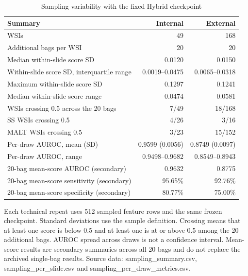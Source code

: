 \clearpage
\begin{table}[H]\centering
\caption{Sampling variability with the fixed Hybrid checkpoint}\label{tab:S10}
\small
\begin{tabular}{p{}rr}
\toprule
Summary & Internal & External \\
\midrule
WSIs & 49 & 168 \\
Additional bags per WSI & 20 & 20 \\
Median within-slide score SD & 0.0120 & 0.0150 \\
Within-slide score SD, interquartile range & 0.0019--0.0475 & 0.0065--0.0318 \\
Maximum within-slide score SD & 0.1297 & 0.1241 \\
Median within-slide score range & 0.0474 & 0.0581 \\
WSIs crossing 0.5 across the 20 bags & 7/49 & 18/168 \\
SS WSIs crossing 0.5 & 4/26 & 3/16 \\
MALT WSIs crossing 0.5 & 3/23 & 15/152 \\
Per-draw AUROC, mean (SD) & 0.9599 (0.0056) & 0.8749 (0.0097) \\
Per-draw AUROC, range & 0.9498--0.9682 & 0.8549--0.8943 \\
20-bag mean-score AUROC (secondary) & 0.9632 & 0.8775 \\
20-bag mean-score sensitivity (secondary) & 95.65\% & 92.76\% \\
20-bag mean-score specificity (secondary) & 80.77\% & 75.00\% \\
\bottomrule
\end{tabular}
\par\medskip\raggedright\footnotesize Each technical repeat uses 512 sampled feature rows and the same frozen checkpoint. Standard deviations use the sample definition. Crossing means that at least one score is below 0.5 and at least one is at or above 0.5 among the 20 additional bags. AUROC spread across draws is not a confidence interval. Mean-score results are secondary summaries across all 20 bags and do not replace the archived single-bag results. Source data: sampling\_summary.csv, sampling\_per\_slide.csv and sampling\_per\_draw\_metrics.csv.
\end{table}
\clearpage

